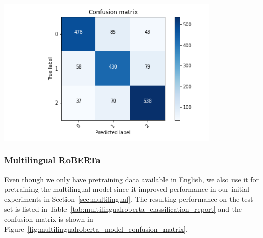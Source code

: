 \documentclass[acmsmall,nonacm]{acmart}
\begin{document}
\vspace*{5ex}
\begin{minipage}[h!]{\textwidth}
  \begin{minipage}[b]{0.49\textwidth}
    \centering
      \includegraphics[width=0.8\textwidth]{assets/distilroberta_confusion_matrix.png}
      \label{fig:distilroberta_model_confusion_matrix}
  \end{minipage}
  \hfill
  \begin{minipage}[b]{0.49\textwidth}
    \centering
      \newline
      \label{tab:distilroberta_classification_report}
    \end{minipage}
  \end{minipage}



\subsubsection{Multilingual RoBERTa}
Even though we only have pretraining data available in English, we also use it for pretraining the multilingual model since it improved performance in our initial experiments in Section~\ref{sec:multilingual}. The resulting performance on the test set is listed in Table~\ref{tab:multilingualroberta_classification_report} and the confusion matrix is shown in Figure~\ref{fig:multilingualroberta_model_confusion_matrix}.
\end{document}
